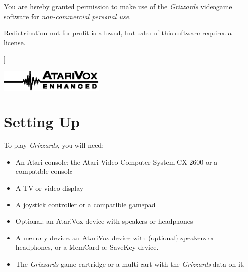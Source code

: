\documentclass[9pt,twocolumn,openany,article]{memoir}
\newenvironment{ritemize}{\begin{itemize}\raggedright}{\end{itemize}}
\newcommand\picaskip{\vspace{12pt}}
\begin{document}
You are hereby granted permission  to make use of the \textit{Grizzards}
videogame software for \emph{non-commercial personal use}.

Redistribution not for profit is allowed, but sales of this software
requires a license.

\fi

\bigskip

]

\includegraphics[width=2in]{../Manual/AtariVoxEnhanced.eps}

\let\cleardoublepage\clearpage

\mainmatter

\tableofcontents

\chapter{Setting Up}\label{Setting Up}

\noindent{}To play \textit{Grizzards}, you will need:

\picaskip

\begin{ritemize}
\item  An Atari  console: the  Atari  Video Computer  System CX-2600  or
  a compatible console
\item A TV or video display
\item A joystick controller or a compatible gamepad
  \ifdefined\ATARIAGESAVE
  \item Optional: an AtariVox device with speakers or headphones
  \else
  \ifdefined\NOSAVE\else
\item A  memory device: an  AtariVox device with (optional)  speakers or
  headphones, or a MemCard or SaveKey device.
  \fi\fi
\item The \textit{Grizzards} game cartridge \ifdefined\ATARIAGESAVE\else
  or a multi-cart with the \textit{Grizzards} data on it. \fi
\end{ritemize}
\end{document}
